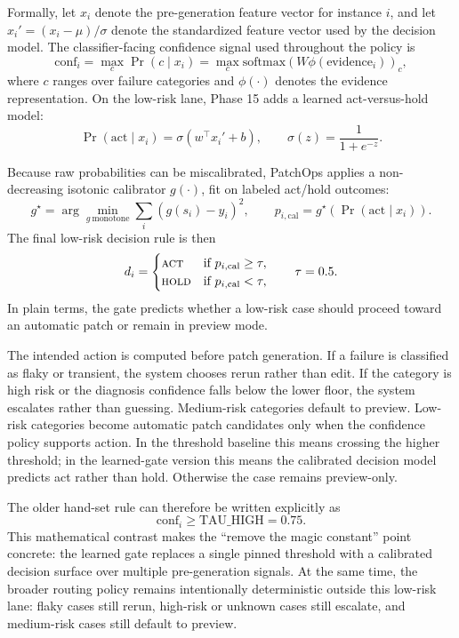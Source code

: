 Formally, let \(x_i\) denote the pre-generation feature vector for instance \(i\), and let
\(x_i' = (x_i - \mu) / \sigma\) denote the standardized feature vector used by the decision model. The
classifier-facing confidence signal used throughout the policy is
\begin{equation}
\mathrm{conf}_i = \max_c \Pr(c \mid x_i) = \max_c \mathrm{softmax}(W\phi(\mathrm{evidence}_i))_c,
\end{equation}
where \(c\) ranges over failure categories and \(\phi(\cdot)\) denotes the evidence representation. On the
low-risk lane, Phase 15 adds a learned act-versus-hold model:
\begin{equation}
\Pr(\mathrm{act} \mid x_i) = \sigma(w^\top x_i' + b),
\qquad
\sigma(z) = \frac{1}{1 + e^{-z}}.
\end{equation}

Because raw probabilities can be miscalibrated, PatchOps applies a non-decreasing isotonic calibrator
\(g(\cdot)\), fit on labeled act/hold outcomes:
\begin{equation}
g^\star = \arg\min_{g \ \mathrm{monotone}} \sum_i \left(g(s_i) - y_i\right)^2,
\qquad
p_{i,\mathrm{cal}} = g^\star\!\left(\Pr(\mathrm{act} \mid x_i)\right).
\end{equation}
The final low-risk decision rule is then
\begin{equation}
d_i =
\begin{cases}
\textsc{act} & \text{if } p_{i,\mathrm{cal}} \ge \tau, \\
\textsc{hold} & \text{if } p_{i,\mathrm{cal}} < \tau,
\end{cases}
\qquad \tau = 0.5.
\end{equation}
In plain terms, the gate predicts whether a low-risk case should proceed toward an automatic patch or remain in
preview mode.

The intended action is computed before patch generation. If a failure is classified as flaky or transient, the
system chooses rerun rather than edit. If the category is high risk or the diagnosis confidence falls below the
lower floor, the system escalates rather than guessing. Medium-risk categories default to preview. Low-risk
categories become automatic patch candidates only when the confidence policy supports action. In the threshold
baseline this means crossing the higher threshold; in the learned-gate version this means the calibrated
decision model predicts act rather than hold. Otherwise the case remains preview-only.

The older hand-set rule can therefore be written explicitly as
\begin{equation}
\mathrm{conf}_i \ge \mathrm{TAU\_HIGH} = 0.75.
\end{equation}
This mathematical contrast makes the ``remove the magic constant'' point concrete: the learned gate replaces a
single pinned threshold with a calibrated decision surface over multiple pre-generation signals. At the same
time, the broader routing policy remains intentionally deterministic outside this low-risk lane: flaky cases
still rerun, high-risk or unknown cases still escalate, and medium-risk cases still default to preview.

